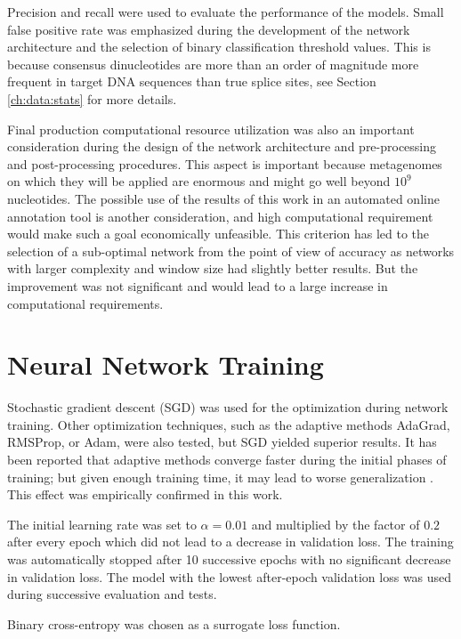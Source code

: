 Precision and recall were used to evaluate the performance of the models. Small
false positive rate was emphasized during the development of the network
architecture and the selection of binary classification threshold values. This
is because consensus dinucleotides are more than an order of magnitude more
frequent in target DNA sequences than true splice sites, see Section
\ref{ch:data:stats} for more details.

Final production computational resource utilization was also an important
consideration during the design of the network architecture and pre-processing
and post-processing procedures. This aspect is important because metagenomes on
which they will be applied are enormous and might go well beyond $10^9$
nucleotides. The possible use of the results of this work in an automated
online annotation tool is another consideration, and high computational
requirement would make such a goal economically unfeasible. This criterion has
led to the selection of a sub-optimal network from the point of view of
accuracy as networks with larger complexity and window size had slightly better
results. But the improvement was not significant and would lead to a large
increase in computational requirements.

\section{\label{ch:rcnn:splice-site-training}Neural Network Training}

Stochastic gradient descent (SGD) was used for the optimization during network
training. Other optimization techniques, such as the adaptive methods AdaGrad,
RMSProp, or Adam, were also tested, but SGD yielded superior results. It has
been reported that adaptive methods converge faster during the initial phases
of training; but given enough training time, it may lead to worse
generalization \cite{wilson2017marginal}. This effect was empirically confirmed
in this work.

The initial learning rate was set to $\alpha = 0.01$ and multiplied by the
factor of $0.2$ after every epoch which did not lead to a decrease in
validation loss. The training was automatically stopped after 10 successive
epochs with no significant decrease in validation loss. The model with the
lowest after-epoch validation loss was used during successive evaluation and
tests.

Binary cross-entropy was chosen as a surrogate loss function.

